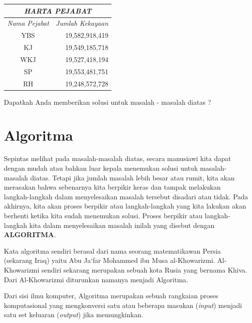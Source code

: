 \begin{enumerate}
		\Large
			\begin{center}
				\begin{tabular}[h!]{| c | r |}
				\hline
				\multicolumn{2}{|c|}{\textit{HARTA PEJABAT}} \\
				\hline	
				\textit{Nama Pejabat } & \textit{Jumlah Kekayaan} \\ \hline
				YBS & 19,582,918,419 \\ \hline
				KJ & 19,549,185,718 \\ \hline
				WKJ & 19,527,418,194 \\ \hline
				SP & 19,553,481,751 \\ \hline
				RH & 19,248,572,728 \\ \hline
				\hline
				\end{tabular}
		\end{center}
		
\end{enumerate}

Dapatkah Anda memberikan solusi untuk masalah - masalah diatas ?  

\section{Algoritma}	
Sepintas melihat pada masalah-masalah diatas, secara manusiawi kita dapat dengan mudah atau bahkan luar kepala menemukan solusi untuk masalah-masalah diatas.  Tetapi jika jumlah masalah lebih besar atau rumit, kita akan merasakan bahwa sebenarnya kita berpikir keras dan tampak melakukan langkah-langkah dalam menyelesaikan masalah tersebut disadari atau tidak. Pada akhirnya, kita akan  proses berpikir atau langkah-langkah yang kita lakukan akan berhenti ketika kita sudah menemukan solusi. Proses berpikir atau langkah-langkah kita dalam menyelesaikan masalah inilah yang disebut dengan \textbf{ALGORITMA}. 

Kata algoritma sendiri berasal dari nama seorang matematikawan Persia (sekarang Iraq) yaitu Abu Ja`far Mohammed ibn Musa al-Khowarizmi. Al-Khowarizmi sendiri sekarang merupakan sebuah kota Rusia yang bernama Khiva. Dari Al-Khowarizmi diturunkan namanya menjadi Algoritma. 

Dari sisi ilmu komputer, Algoritma merupakan sebuah rangkaian proses komputasional yang mengkonversi satu atau beberapa masukan (\textit{input}) menjadi satu set keluaran (\textit{output}) jika memungkinkan. 

